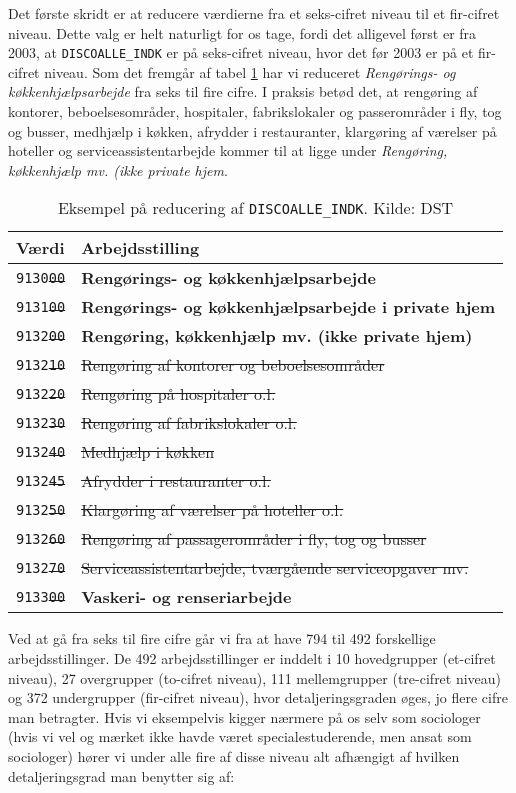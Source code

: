 Det første skridt er at reducere værdierne fra et seks-cifret niveau til et fir-cifret niveau. Dette valg er helt naturligt for os tage, fordi det alligevel først er fra 2003, at \texttt{DISCOALLE\_INDK} er på seks-cifret niveau, hvor det før 2003 er på et fir-cifret niveau. Som det fremgår af tabel \ref{tab_reducering} har vi reduceret \emph{Rengørings- og køkkenhjælpsarbejde} fra seks til fire cifre. I praksis betød det, at rengøring af kontorer, beboelsesområder, hospitaler, fabrikslokaler og passerområder i fly, tog og busser, medhjælp i køkken, afrydder i restauranter, klargøring af værelser på hoteller og serviceassistentarbejde kommer til at ligge under \emph{Rengøring, køkkenhjælp mv. (ikke private hjem}.
% 
\begin{table}[H] \centering
\caption{Eksempel på reducering af \texttt{DISCOALLE\_INDK}. Kilde: DST}
\label{tab_reducering}
\begin{tabular}{@{}ll@{}} \toprule
Værdi  & Arbejdsstilling \\ \midrule
  \texttt{9130\sout{00}} & \textbf{Rengørings- og køkkenhjælpsarbejde} \\ \hline
  \texttt{9131\sout{00}} & \textbf{Rengørings- og køkkenhjælpsarbejde i private hjem} \\ \hline
  \texttt{9132\sout{00}} & \textbf{Rengøring, køkkenhjælp mv. (ikke private hjem)} \\ 
  \texttt{9132\sout{10}} & \sout{Rengøring af kontorer og beboelsesområder} \\ 
  \texttt{9132\sout{20}} & \sout{Rengøring på hospitaler o.l.} \\ 
  \texttt{9132\sout{30}} & \sout{Rengøring af fabrikslokaler o.l.} \\ 
  \texttt{9132\sout{40}} & \sout{Medhjælp i køkken} \\ 
  \texttt{9132\sout{45}} & \sout{Afrydder i restauranter o.l.} \\ 
  \texttt{9132\sout{50}} & \sout{Klargøring af værelser på hoteller o.l.} \\ 
  \texttt{9132\sout{60}} & \sout{Rengøring af passagerområder i fly, tog og busser} \\ 
  \texttt{9132\sout{70}} & \sout{Serviceassistentarbejde, tværgående serviceopgaver mv.} \\ \hline
  \texttt{9133\sout{00}} & \textbf{Vaskeri- og renseriarbejde} \\ \bottomrule
\end{tabular} \end{table}
% 
Ved at gå fra seks til fire cifre går vi fra at have 794 til 492 forskellige arbejdsstillinger. De 492 arbejdsstillinger er inddelt i 10 hovedgrupper (et-cifret niveau), 27 overgrupper (to-cifret niveau), 111 mellemgrupper (tre-cifret niveau) og 372 undergrupper (fir-cifret niveau), hvor detaljeringsgraden øges, jo flere cifre man betragter. Hvis vi eksempelvis kigger nærmere på os selv som sociologer (hvis vi vel og mærket ikke havde været specialestuderende, men ansat som sociologer) hører vi under alle fire af disse niveau alt afhængigt af hvilken detaljeringsgrad man benytter sig af:
